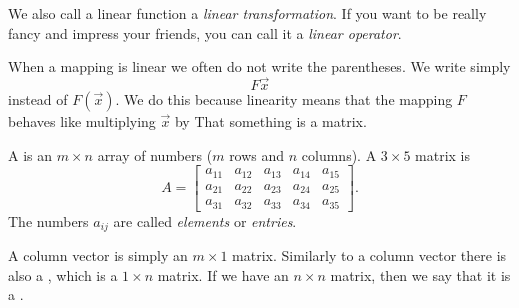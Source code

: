 We also call a linear function a
\emph{linear transformation}.
If you want to be really fancy and impress your friends, you can call it a
\emph{linear operator}.

When a mapping is linear we often do not write the parentheses.  We write
simply
\begin{equation*}
F \vec{x}
\end{equation*}
instead of $F(\vec{x})$.  We do this because linearity means that the
mapping $F$
behaves like multiplying $\vec{x}$ by 
That something is a matrix.

A \emph{}
is an $m
\times n$ array of numbers ($m$ rows and $n$ columns).  A
$3 \times 5$ matrix is
\begin{equation*}
A = 
\begin{bmatrix}
a_{11} & a_{12} & a_{13} & a_{14} & a_{15} \\
a_{21} & a_{22} & a_{23} & a_{24} & a_{25} \\
a_{31} & a_{32} & a_{33} & a_{34} & a_{35}
\end{bmatrix} .
\end{equation*}
The numbers $a_{ij}$ are called \emph{elements}
or \emph{entries}.

A column vector is simply an $m \times 1$ matrix.  Similarly to
a column vector there is also a 
\emph{}, which is a $1 \times n$ matrix.
If we have an $n \times n$ matrix, then we say that it is a
\emph{}.

